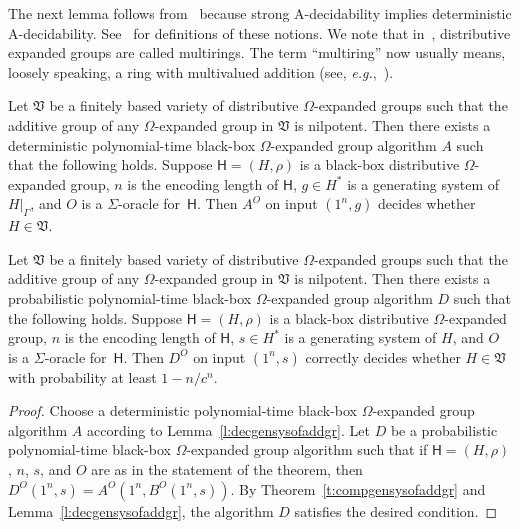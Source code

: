 \documentclass{jgcc}
\newcommand{\cl}{\mathfrak}
\newcommand{\bb}{\mathsf}
\newcommand{\Add}[1]{#1|_\Gamma}
\newcommand{\eg}{\emph{e.g.}}
\begin{document}
The next lemma follows from~\cite[Theorem~5.1]{Ano02}
because strong A-decidability implies deterministic
A-decidability. See~\cite[Section~3]{Ano02} for definitions
of these notions. We note that in~\cite{Ano02}, distributive
expanded groups are called multirings. The term
``multiring'' now usually means, loosely speaking, a ring
with multivalued addition (see,
\eg,~\cite[Definition~2.1]{Mar06}).

\begin{lem}
\label{l:decgensysofaddgr}
Let $\cl V$ be a finitely based variety of distributive
$\Omega$-expanded groups such that the additive group of any
$\Omega$-expanded group in $\cl V$ is nilpotent. Then there
exists a deterministic polynomial-time black-box
$\Omega$-expanded group algorithm $A$ such that the
following holds. Suppose $\bb H=(H,\rho)$ is a black-box
distributive $\Omega$-expanded group, $n$ is the encoding
length of $\bb H$, $g\in H^*$ is a generating system of
$\Add H$, and $O$ is a $\Sigma$-oracle for~$\bb H$. Then
$A^O$ on input $(1^n,g)$ decides whether $H\in\cl V$.
\end{lem}

\begin{thm}
\label{t:decgensys}
Let $\cl V$ be a finitely based variety of distributive
$\Omega$-expanded groups such that the additive group of any
$\Omega$-expanded group in $\cl V$ is nilpotent. Then there
exists a probabilistic polynomial-time black-box
$\Omega$-expanded group algorithm $D$ such that the
following holds. Suppose $\bb H=(H,\rho)$ is a black-box
distributive $\Omega$-expanded group, $n$ is the encoding
length of $\bb H$, $s\in H^*$ is a generating system of $H$,
and $O$ is a $\Sigma$-oracle for~$\bb H$. Then $D^O$ on
input $(1^n,s)$ correctly decides whether $H\in\cl V$ with
probability at least $1-n/c^n$.
\end{thm}
\begin{proof}
Choose a deterministic polynomial-time black-box
$\Omega$-expanded group algorithm $A$ according to
Lemma~\ref{l:decgensysofaddgr}. Let $D$ be a probabilistic
polynomial-time black-box $\Omega$-expanded group algorithm
such that if $\bb H=(H,\rho)$, $n$, $s$, and $O$ are as in
the statement of the theorem, then
$D^O(1^n,s)=A^O(1^n,B^O(1^n,s))$. By
Theorem~\ref{t:compgensysofaddgr} and
Lemma~\ref{l:decgensysofaddgr}, the algorithm $D$ satisfies
the desired condition.
\end{proof}
\end{document}

